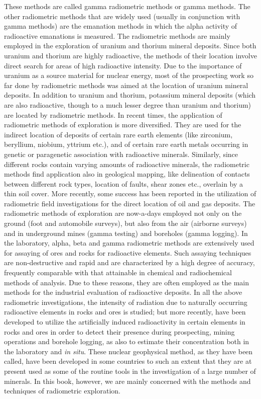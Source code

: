 These methods are called gamma radiometric methods or gamma methods.
The other radiometric methods that are widely used (usually in conjunction with gamma methods) are the emanation methods in which the alpha activity of radioactive emanations is measured.
\smallskip
The radiometric methods are mainly employed in the exploration of uranium and thorium mineral deposits.
Since both uranium and thorium are highly radioactive, the methods of their location involve direct search for areas of high radioactive intensity.
Due to the importance of uranium as a source material for nuclear energy, most of the prospecting work so far done by radiometric methods was aimed at the location of uranium mineral deposits.
In addition to uranium and thorium, potassium mineral deposits (which are also radioactive, though to a much lesser degree than uranium and thorium) are located by radiometric methods.
\smallskip
In recent times, the application of radiometric methods of exploration is more diversified.
They are used for the indirect location of deposits of certain rare earth elements (like zirconium, beryllium, niobium, yttrium etc.), and of certain rare earth metals occurring in genetic or paragenetic association with radioactive minerals.
Similarly, since different rocks contain varying amounts of radioactive minerals, the radiometric methods find application also in geological mapping, like delineation of contacts between different rock types, location of faults, shear zones etc., overlain by a thin soil cover.
More recently, some success has been reported in the utilization of radiometric field investigations for the direct location of oil and gas deposits.
\smallskip
The radiometric methods of exploration are now-a-days employed not only on the ground (foot and automobile surveys), but also from the air (airborne surveys) and in underground mines (gamma testing) and boreholes (gamma logging).
\smallskip
In the laboratory, alpha, beta and gamma radiometric methods are extensively used for assaying of ores and rocks for radioactive elements.
Such assaying techniques are non-destructive and rapid and are characterized by a high degree of accuracy, frequently comparable with that attainable in chemical and radiochemical methods of analysis.
Due to these reasons, they are often employed as the main methods for the industrial evaluation of radioactive deposits.
\smallskip
In all the above radiometric investigations, the intensity of radiation due to naturally occurring radioactive elements in rocks and ores is studied; but more recently, have been developed to utilize the artificially induced radioactivity in certain elements in rocks and ores in order to detect their presence during prospecting, mining operations and borehole logging, as also to estimate their concentration both in the laboratory and {\it in situ\/}.
These nuclear geophysical method, as they have been called, have been developed in some countries to such an extent that they are at present used as some of the routine tools in the investigation of a large number of minerals.
In this book, however, we are mainly concerned with the methods and techniques of radiometric exploration.
\vfill
\eject
